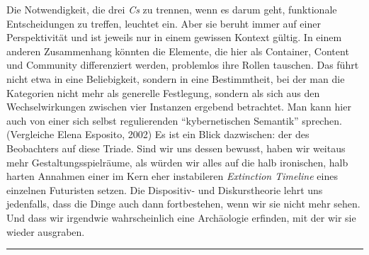 \documentclass[output=paper]{langscibook}
\begin{document}
Die Notwendigkeit, die drei \emph{Cs} zu trennen, wenn es darum geht,
funktionale Entscheidungen zu treffen, leuchtet ein. Aber sie beruht
immer auf einer Perspektivität und ist jeweils nur in einem gewissen
Kontext gültig. In einem anderen Zusammenhang könnten die Elemente, die
hier als Container, Content und Community differenziert werden,
problemlos ihre Rollen tauschen. Das führt nicht etwa in eine
Beliebigkeit, sondern in eine Bestimmtheit, bei der man die Kategorien
nicht mehr als generelle Festlegung, sondern als sich aus den
Wechselwirkungen zwischen vier Instanzen ergebend betrachtet. Man kann
hier auch von einer sich selbst regulierenden \enquote{kybernetischen
Semantik} sprechen. (Vergleiche Elena Esposito, 2002) Es ist ein Blick
dazwischen: der des Beobachters auf diese Triade. Sind wir uns dessen
bewusst, haben wir weitaus mehr Gestaltungsspielräume, als würden wir
alles auf die halb ironischen, halb harten Annahmen einer im Kern eher
instabileren \emph{Extinction Timeline} eines einzelnen Futuristen
setzen. Die Dispositiv- und Diskurstheorie lehrt uns jedenfalls, dass
die Dinge auch dann fortbestehen, wenn wir sie nicht mehr sehen. Und
dass wir irgendwie wahrscheinlich eine Archäologie erfinden, mit der wir
sie wieder ausgraben.

\begin{center}\rule{0.5\linewidth}{0.5pt}\end{center}
\end{document}
